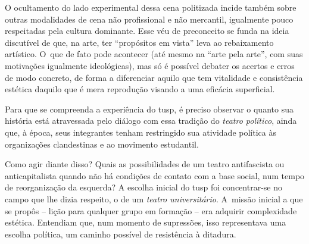 O ocultamento do lado experimental dessa cena politizada incide também
sobre outras modalidades de cena não profissional e não mercantil,
igualmente pouco respeitadas pela cultura dominante. Esse véu de
preconceito se funda na ideia discutível de que, na arte, ter “propósitos em
vista” leva ao rebaixamento artístico. O~que de
fato pode acontecer (até mesmo na “arte pela arte”, com suas motivações
igualmente ideológicas), mas só é possível debater os acertos e erros de
modo concreto, de forma a diferenciar aquilo que tem vitalidade e
consistência estética daquilo que é mera reprodução visando a uma
eficácia superficial.

Para que se compreenda a experiência do {\sc tusp}, é preciso observar o
quanto sua história está atravessada pelo diálogo com essa tradição do
{\it teatro político}, ainda que, à época, seus integrantes tenham restringido sua atividade política às organizações clandestinas e ao movimento
estudantil.


Como agir diante disso? Quais as possibilidades de um teatro
antifascista ou anticapitalista quando não há condições de contato com a
base social, num tempo de reorganização da esquerda? A escolha inicial
do {\sc tusp} foi concentrar-se no campo que lhe dizia respeito, o de um
{\it teatro universitário}. A~missão inicial a que se propôs -- lição
para qualquer grupo em formação -- era adquirir complexidade estética.
Entendiam que, num momento de supressões, isso representava uma escolha
política, um caminho possível de resistência à ditadura.



